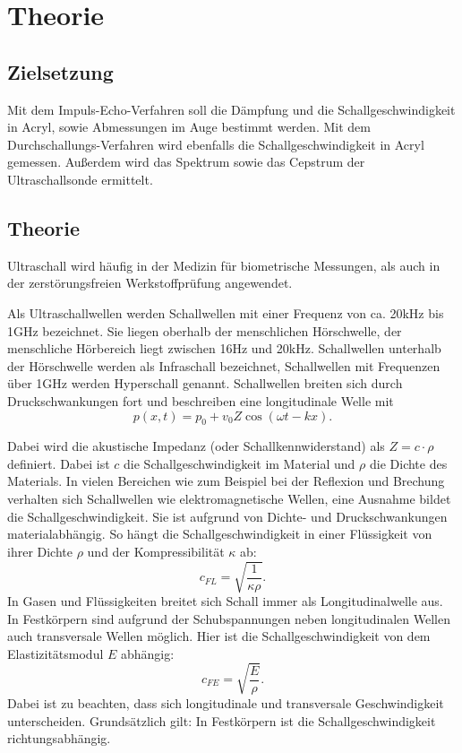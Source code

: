 \section{Theorie}
\label{sec:Theorie}


\subsection{Zielsetzung}
Mit dem Impuls-Echo-Verfahren soll die Dämpfung und die Schallgeschwindigkeit in
Acryl, sowie Abmessungen im Auge bestimmt werden. Mit dem Durchschallungs-Verfahren
wird ebenfalls die Schallgeschwindigkeit in Acryl gemessen.
Außerdem wird das Spektrum sowie das Cepstrum der Ultraschallsonde ermittelt.


\subsection{Theorie}
Ultraschall wird häufig in der Medizin für biometrische Messungen, als auch in
der zerstörungsfreien Werkstoffprüfung angewendet.

Als Ultraschallwellen werden Schallwellen mit einer Frequenz von ca. 20\;kHz bis 1\;GHz
bezeichnet. Sie liegen oberhalb der menschlichen Hörschwelle, der menschliche
Hörbereich liegt zwischen 16\;Hz und 20\;kHz. Schallwellen unterhalb der Hörschwelle werden
als Infraschall bezeichnet, Schallwellen mit Frequenzen über 1\;GHz werden
Hyperschall genannt.
Schallwellen breiten sich durch Druckschwankungen fort und beschreiben eine
longitudinale Welle mit
\begin{equation}
  p(x,t)= p_0 +v_0 Z\cos{(\omega t - k x)}.
  \label{longitud}
\end{equation}

Dabei wird die akustische Impedanz (oder Schallkennwiderstand) als $Z=c\cdot\rho$
definiert. Dabei ist $c$ die Schallgeschwindigkeit im Material und $\rho$
die Dichte des Materials. In vielen Bereichen wie zum Beispiel bei der
Reflexion und Brechung verhalten sich Schallwellen wie elektromagnetische Wellen, eine
Ausnahme bildet die Schallgeschwindigkeit. Sie ist aufgrund von
Dichte- und Druckschwankungen materialabhängig. So hängt die Schallgeschwindigkeit
in einer Flüssigkeit von ihrer Dichte $\rho$ und der Kompressibilität $\kappa$
ab:
\begin{equation}
  c_{FL}=\sqrt{\frac{1}{\kappa \rho}}.
  \label{cfl}
\end{equation}
In Gasen und Flüssigkeiten breitet sich Schall immer als Longitudinalwelle aus.
In Festkörpern sind aufgrund der Schubspannungen neben longitudinalen Wellen auch
transversale Wellen möglich. Hier ist die Schallgeschwindigkeit von dem
Elastizitätsmodul $E$ abhängig:
\begin{equation}
  c_{FE}=\sqrt{\frac{E}{\rho}}.
  \label{cfest}
\end{equation}
Dabei ist zu beachten, dass sich longitudinale und transversale Geschwindigkeit
unterscheiden. Grundsätzlich gilt: In Festkörpern ist die Schallgeschwindigkeit
richtungsabhängig.

